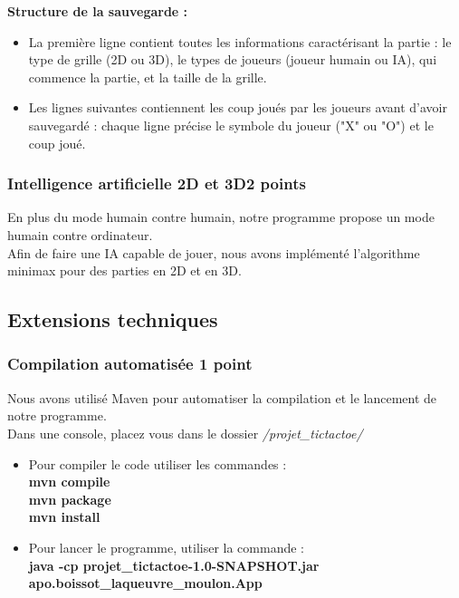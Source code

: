 \documentclass{article}
\begin{document}
\textbf{Structure de la sauvegarde :}
 \begin{itemize}
    \item La première ligne contient toutes les informations caractérisant la partie : le type de grille (2D ou 3D), le types de joueurs (joueur humain ou IA), qui commence la partie, et la taille de la grille.
    \item Les lignes suivantes contiennent les coup joués par les joueurs avant d'avoir sauvegardé : chaque ligne précise le symbole du joueur ("X" ou "O") et le coup joué.
\end{itemize}


\subsubsection{Intelligence artificielle 2D et 3D\hfill 2 points}
En plus du mode humain contre humain, notre programme propose un mode humain contre ordinateur.\\
Afin de faire une IA capable de jouer, nous avons implémenté l'algorithme minimax pour des parties en 2D et en 3D.\\

\subsection{Extensions techniques}
\subsubsection{Compilation automatisée \hfill 1 point}
Nous avons utilisé Maven pour automatiser la compilation et le lancement de notre programme.\\
Dans une console, placez vous dans le dossier \textit{ /projet\_tictactoe/}\\
 \begin{itemize}
    \item Pour compiler le code utiliser les commandes : \\
    \textbf{mvn compile \\
            mvn package \\
            mvn install}

    \item Pour lancer le programme, utiliser la commande : \\
    \textbf{java -cp projet\_tictactoe-1.0-SNAPSHOT.jar apo.boissot\_laqueuvre\_moulon.App}
 \end{itemize}
\end{document}
